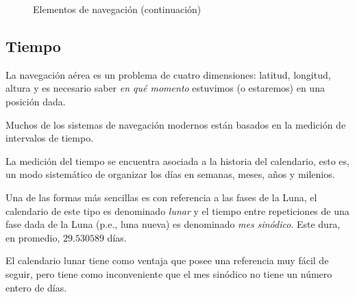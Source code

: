 \documentclass[a4paper,12pt,twoside]{article}
\begin{document}
\begin{figure}[!h]
  \centering
  \caption{Elementos de navegaci\'on (continuaci\'on)}
\end{figure}

\subsection{Tiempo}
\label{sec:tiempo}

La navegaci\'on a\'erea es un problema de cuatro dimensiones: latitud, longitud, altura y es necesario saber \emph{en qu\'e momento} estuvimos (o estaremos) en una posici\'on dada.

Muchos de los sistemas de navegaci\'on modernos est\'an basados en la medici\'on de intervalos de tiempo.

La medici\'on del tiempo se encuentra asociada a la historia del calendario, esto es, un modo sistem\'atico de organizar los d\'ias en semanas, meses, a\~nos y milenios.

Una de las formas m\'as sencillas es con referencia a las fases de la Luna, el calendario de este tipo es denominado \emph{lunar} y el tiempo entre repeticiones de una fase dada de la Luna (p.e., luna nueva) es denominado \emph{mes sin\'odico}. Este dura, en promedio, $29.530589$ d\'ias.

El calendario lunar tiene como ventaja que posee una referencia muy f\'acil de seguir, pero tiene como inconveniente que el mes sin\'odico no tiene un n\'umero entero de d\'ias.
\end{document}
